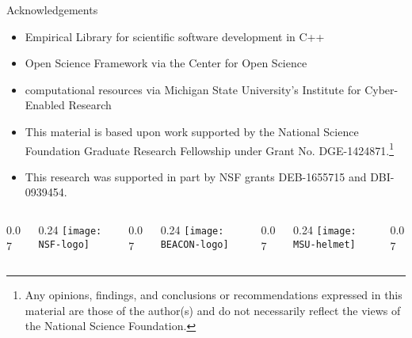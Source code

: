 \begin{frame}{Acknowledgements}
\small
\begin{itemize}
\item Empirical Library for scientific software development in C++
\item Open Science Framework via the Center for Open Science
\item computational resources via Michigan State University's Institute for Cyber-Enabled Research
\item This material is based upon work supported by the National Science Foundation Graduate Research Fellowship under Grant No. DGE-1424871.\footnote[1]{\label{foot:disclaimer} \tiny Any opinions, findings, and conclusions or recommendations expressed in this material are those of the author(s) and do not necessarily reflect the views of the National Science Foundation.}
\item This research was supported in part by NSF grants DEB-1655715 and DBI-0939454.\footnotemark[1]
\end{itemize}

\vfill

\newcommand{\innerspacer}{0.07\textwidth}
\newcommand{\content}{0.24\textwidth}
\newcommand{\outerspacer}{0.07\textwidth}

\begin{center}
 \begin{columns}
	\begin{column}{\outerspacer}~\end{column}
	 \begin{column}{\content}
		\texttt{[image: NSF-logo]}
 	\end{column}
  \begin{column}{\innerspacer}~\end{column}
	 \begin{column}{\content}
		\texttt{[image: BEACON-logo]}
 	\end{column}
  \begin{column}{\innerspacer}~\end{column}
 	\begin{column}{\content}
   \texttt{[image: MSU-helmet]}
 	\end{column}
 	\begin{column}{\outerspacer}~\end{column}
 \end{columns}
\end{center}

\end{frame}



